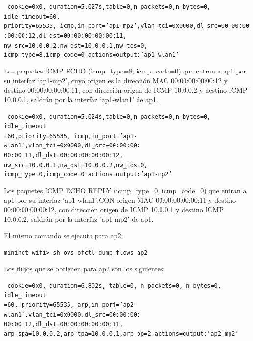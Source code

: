 \documentclass[a4paper,12pt,twoside,spanish]{book}
\begin{document}
\noindent\texttt{
	cookie=0x0, duration=5.027s,table=0,n\_packets=0,n\_bytes=0, idle\_timeout=60,\\
	priority=65535,
	icmp,in\_port='ap1-mp2',vlan\_tci=0x0000,dl\_src=00:00:00\\
	:00:00:12,dl\_dst=00:00:00:00:00:11,
	nw\_src=10.0.0.2,nw\_dst=10.0.0.1,nw\_tos=0,\\
	icmp\_type=8,icmp\_code=0 actions=output:'ap1-wlan1'
}

Los paquetes ICMP ECHO (icmp\_type=8, icmp\_code=0) que entran a ap1 por su interfaz ‘ap1-mp2’, cuyo origen es la dirección MAC 00:00:00:00:00:12 y destino 00:00:00:00:00:11, con dirección origen de ICMP 10.0.0.2 y destino ICMP 10.0.0.1, saldrán por la interfaz ‘ap1-wlan1’ de ap1.\par 

\noindent\texttt{
	cookie=0x0, duration=5.024s,table=0,n\_packets=0,n\_bytes=0, idle\_timeout\\
	=60,priority=65535,
	icmp,in\_port='ap1-wlan1',vlan\_tci=0x0000,dl\_src=00:00:00:\\
	00:00:11,dl\_dst=00:00:00:00:00:12,
	nw\_src=10.0.0.1,nw\_dst=10.0.0.2,nw\_tos=0,\\
	icmp\_type=0,icmp\_code=0 actions=output:'ap1-mp2'
}

Los paquetes ICMP ECHO REPLY (icmp\_type=0, icmp\_code=0) que entran a ap1 por su interfaz ‘ap1-wlan1’,CON origen MAC 00:00:00:00:00:11 y destino 00:00:00:00:00:12, con dirección origen de ICMP 10.0.0.1 y destino ICMP 10.0.0.2, saldrán por la interfaz ‘ap1-mp2’ de ap1.\par 

\hspace{1cm}

El mismo comando se ejecuta para ap2:\par 

\begin{center}
	\texttt{mininet-wifi> sh ovs-ofctl dump-flows ap2}
\end{center}

Los flujos que se obtienen para ap2 son los siguientes:\par

\noindent\texttt{
	cookie=0x0, duration=6.802s, table=0, n\_packets=0, n\_bytes=0, idle\_timeout\\
	=60, priority=65535,
	arp,in\_port='ap2-wlan1',vlan\_tci=0x0000,dl\_src=00:00:00:\\
	00:00:12,dl\_dst=00:00:00:00:00:11,
	arp\_spa=10.0.0.2,arp\_tpa=10.0.0.1,arp\_op=2 actions=output:'ap2-mp2'
}
\end{document}
